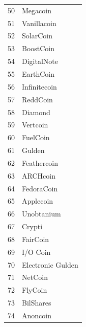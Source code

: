 \documentclass[a5paper, twoside]{book}
\begin{document}
\begin{center}
\begin{tabular}{ r | l }
    50 & Megacoin \\
    51 & Vanillacoin \\
    52 & SolarCoin \\
    53 & BoostCoin \\
    54 & DigitalNote \\
    55 & EarthCoin \\
    56 & Infinitecoin \\
    57 & ReddCoin \\
    58 & Diamond \\
    59 & Vertcoin \\
    60 & FuelCoin \\
    61 & Gulden \\
    62 & Feathercoin \\
    63 & ARCHcoin \\
    64 & FedoraCoin \\
    65 & Applecoin \\
    66 & Unobtanium \\
    67 & Crypti \\
    68 & FairCoin \\
    69 & I/O Coin \\
    70 & Electronic Gulden \\
    71 & NetCoin \\
    72 & FlyCoin \\
    73 & BilShares \\
    74 & Anoncoin \\
\end{tabular}
\end{center}
\newpage
\end{document}
